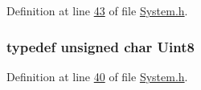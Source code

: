 Definition at line \hyperlink{a00072_source_l00043}{43} of file \hyperlink{a00072_source}{System.\+h}.

\hypertarget{a00072_af84840501dec18061d18a68c162a8fa2}{
\subsubsection[{Uint8}]{\setlength{\rightskip}{0pt plus 5cm}typedef unsigned char {\bf Uint8}}}\label{a00072_af84840501dec18061d18a68c162a8fa2}


Definition at line \hyperlink{a00072_source_l00040}{40} of file \hyperlink{a00072_source}{System.\+h}.

